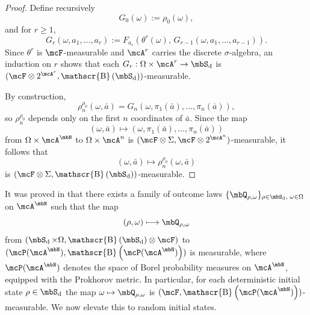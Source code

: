 \documentclass[a4paper]{article}
\numberwithin{equation}{section}   %
\theoremstyle{plain}   %
\theoremstyle{plain}   %
\theoremstyle{examplestyle}
\DeclareMathOperator{\states}{\mbS_d}   %
\DeclareMathOperator{\dummyborel}{\mathscr{B}}                  %
\newcommand\borel[1]{\dummyborel\left(#1\right)}    %
\begin{document}
\begin{appendix}
\begin{proof}
            Define recursively
            \[
                G_0(\omega):=\rho_0(\omega),
            \]
            and for \(r\ge1\),
            \[
                G_r(\omega,a_1,\dots,a_r)
                :=
                F_{a_r}\!\left(\theta^r(\omega),\,G_{r-1}(\omega,a_1,\dots,a_{r-1})\right).
            \]
            Since \(\theta^r\) is \(\mcF\)-measurable and \(\mcA^r\) carries the discrete \(\sigma\)-algebra, an induction on \(r\) shows that each  \(G_r:\Omega\times\mcA^r\to\states\) is
            \((\mcF\otimes 2^{\mcA^r},\borel{\states})\)-measurable.
        
            By construction,
            \[
                \rho_n^{\rho_0}(\omega,\bar a)
                =
                G_n\left(\omega,\pi_1(\bar a),\dots,\pi_n(\bar a)\right),
            \]
            so \(\rho_n^{\rho_0}\) depends only on the first \(n\) coordinates of \(\bar a\).
            Since the map
            \[
                (\omega,\bar a)\longmapsto (\omega,\pi_1(\bar a),\dots,\pi_n(\bar a))
            \]
            from \(\Omega\times\mcA^\mbN\) to \(\Omega\times\mcA^n\) is  \((\mcF\otimes\Sigma,\mcF\otimes 2^{\mcA^n})\)-measurable, it follows that
            \[
                (\omega,\bar a)\longmapsto \rho_n^{\rho_0}(\omega,\bar a)
            \]
            is \((\mcF\otimes\Sigma,\borel{\states})\)-measurable.
        \end{proof}

    It was proved in \cite{traj} that there exists a family of outcome laws $\{\mbQ_{\rho,\omega}\}_{\rho\in\states,\;\omega\in\Omega}$ on $\mcA^{\mbN}$ such that the map
    \[
        (\rho,\omega) \longmapsto \mbQ_{\rho,\omega}
    \]
    from $(\states\times\Omega,\borel{\states}\otimes\mcF)$ to $(\mcP(\mcA^\mbN),\borel{\mcP(\mcA^\mbN)})$ is measurable, where $\mcP(\mcA^\mbN)$ denotes the space of Borel probability measures on $\mcA^\mbN$, equipped with the Prokhorov metric.
    In particular, for each deterministic initial state $\rho\in\states$ the map $\omega\mapsto\mbQ_{\rho,\omega}$ is $(\mcF,\borel{\mcP(\mcA^\mbN)})$-measurable.
    We now elevate this to random initial states.


\end{appendix}
\end{document}
